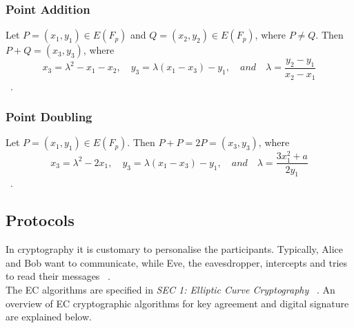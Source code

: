 \documentclass[11pt]{article}
\begin{document}
\subsubsection{Point Addition} \label{Point Addition}
Let $P = (x_1,y_1) \in E(F_p)$ and $Q = (x_2,y_2) \in E(F_p)$, where $P \neq Q$. 
Then $P + Q = (x_3,y_3)$, where\\
\begin{equation*}
    x_3 = \lambda^2 - x_1 - x_2, \quad y_3 = \lambda(x_1 - x_3) - y_1, \quad and \quad \lambda = \frac{y_2-y_1}{x_2-x_1}
\end{equation*}
~\cite{lopez2000overview}.

\subsubsection{Point Doubling} \label{Point Addition}
Let $P = (x_1,y_1) \in E(F_p)$. 
Then $P + P = 2P = (x_3,y_3)$, where\\
\begin{equation*}
    x_3 = \lambda^2 - 2x_1, \quad y_3 = \lambda(x_1 - x_3) - y_1, \quad and \quad \lambda = \frac{3x_1^2 + a}{2y_1}
\end{equation*}
~\cite{lopez2000overview}.

\subsection{Protocols} \label{Protocols}
In cryptography it is customary to personalise the participants. 
Typically, Alice and Bob want to communicate, while Eve, the eavesdropper, 
intercepts and tries to read their messages ~\cite{silverman2009arithmetic}.\\
The EC algorithms are specified in \emph{SEC 1: Elliptic Curve Cryptography} ~\cite{secg20091}. 
An overview of EC cryptographic algorithms for key agreement and digital signature are explained below.
\end{document}

